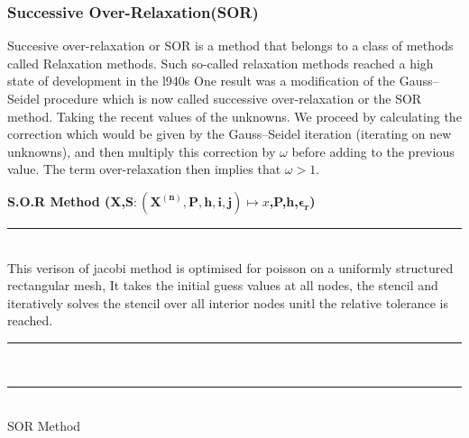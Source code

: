 \subsubsection{Successive Over-Relaxation(SOR)}
Succesive over-relaxation or SOR is a method that belongs to a class of methods called Relaxation methods. Such so-called relaxation methods reached a high state of development in the l940s  One result was a modiﬁcation of the Gauss–Seidel procedure which is now called successive over-relaxation or the SOR method. Taking the recent values of the unknowns. We proceed by calculating the correction which would be given by the Gauss–Seidel iteration (iterating on new unknowns), and then multiply this correction by $\omega$ before adding to the previous value. The term over-relaxation then implies that $\omega>1$. \\[2mm]
\begin{algorithm}[H]
    \textbf{\large S.O.R Method (X,$\mathbf{S:(X^{(n)},P,h,i,j)} \mapsto x$,P,h,$\mathbf{\epsilon_r}$)}\\[-1pt]
    \par\noindent\rule{\textwidth}{0.4pt} \\
    This verison of jacobi method is optimised for poisson on a uniformly structured rectangular mesh, It takes the initial guess values at all nodes, the stencil and iteratively solves the stencil over all interior nodes unitl the relative tolerance is reached.  \\[2mm]
    \par\noindent\rule{\textwidth}{0.4pt} \\
    \par\noindent\rule{\textwidth}{0.4pt} \\[2mm]
    \caption{SOR Method}
\end{algorithm}                                    
